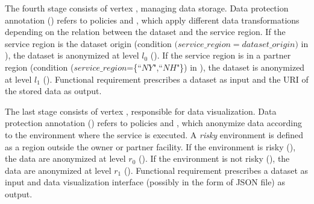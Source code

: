 \begin{example}[\bf \pipelineTemplate]
  The fourth stage consists of vertex , managing data storage. Data protection annotation \myLambda() refers to policies  and , which apply different data transformations depending on the relation between the dataset and the service region.
  If the service region is the dataset origin (condition $(service\_region$$=$$dataset\_origin)$ in ), the dataset is anonymized at level $l_0$ ().
  If the service region is in a partner region (condition ($service\_region$=\{``$NY$",``$NH$"\}) in ), the dataset is anonymized at level $l_1$ ().
  Functional requirement  prescribes a dataset as input and the URI of the stored data as output.

  The last stage consists of vertex , responsible for data visualization.
  Data protection annotation \myLambda() refers to policies  and , which anonymize data according to the environment where the service is executed.
  A \emph{risky} environment is defined as a region outside the owner or partner facility.
  If the environment is risky (), the data are anonymized at level $r_0$ ().
  If the environment is not risky (), the data are anonymized at level $r_1$ ().
  Functional requirement  prescribes a dataset as input and data visualization interface (possibly in the form of JSON file) as output.
\end{example}



